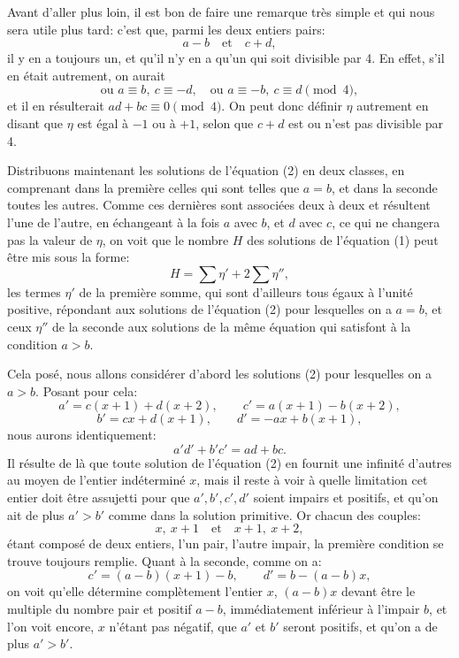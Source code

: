\documentclass[11pt]{article}
\begin{document}
Avant d'aller plus loin, il est bon de faire une remarque très simple et qui nous sera utile plus tard: c'est que, parmi les deux entiers pairs:
\[
a-b\quad\text{et}\quad c+d,
\]
il y en a toujours un, et qu'il n'y en a qu'un qui soit divisible par 4. En effet, s'il en était autrement, on aurait
\[
\text{ou } a\equiv b,\ c\equiv -d,\quad
\text{ou } a\equiv -b,\ c\equiv d \pmod{4},
\]
et il en résulterait \(ad+bc\equiv0\pmod{4}\). On peut donc définir \(\eta\) autrement en disant que \(\eta\) est égal à \(-1\) ou à \(+1\), selon que \(c+d\) est ou n'est pas divisible par 4.

Distribuons maintenant les solutions de l'équation (2) en deux classes, en comprenant dans la première celles qui sont telles que \(a=b\), et dans la seconde toutes les autres. Comme ces dernières sont associées deux à deux et résultent l'une de l'autre, en échangeant à la fois \(a\) avec \(b\), et \(d\) avec \(c\), ce qui ne changera pas la valeur de \(\eta\), on voit que le nombre \(H\) des solutions de l'équation (1) peut être mis sous la forme:
\[
H=\sum\eta' + 2\sum\eta'',
\]
les termes \(\eta'\) de la première somme, qui sont d'ailleurs tous égaux à l'unité positive, répondant aux solutions de l'équation (2) pour lesquelles on a \(a=b\), et ceux \(\eta''\) de la seconde aux solutions de la même équation qui satisfont à la condition \(a>b\).

Cela posé, nous allons considérer d'abord les solutions (2) pour lesquelles on a \(a>b\). Posant pour cela:
\[
a'=c(x+1)+d(x+2),\qquad c'=a(x+1)-b(x+2),
\]
\[
b'=cx+d(x+1),\qquad d'=-ax+b(x+1),
\]
nous aurons identiquement:
\[
a'd'+b'c'=ad+bc.
\]
Il résulte de là que toute solution de l'équation (2) en fournit une infinité d'autres au moyen de l'entier indéterminé \(x\), mais il reste à voir à quelle limitation cet entier doit être assujetti pour que \(a',b',c',d'\) soient impairs et positifs, et qu'on ait de plus \(a'>b'\) comme dans la solution primitive. Or chacun des couples:
\[
x,\ x+1\quad\text{et}\quad x+1,\ x+2,
\]
étant composé de deux entiers, l'un pair, l'autre impair, la première condition se trouve toujours remplie. Quant à la seconde, comme on a:
\[
c'=(a-b)(x+1)-b,\qquad d'=b-(a-b)x,
\]
on voit qu'elle détermine complètement l'entier \(x\), \((a-b)x\) devant être le multiple du nombre pair et positif \(a-b\), immédiatement inférieur à l'impair \(b\), et l'on voit encore, \(x\) n'étant pas négatif, que \(a'\) et \(b'\) seront positifs, et qu'on a de plus \(a'>b'\).
\end{document}
